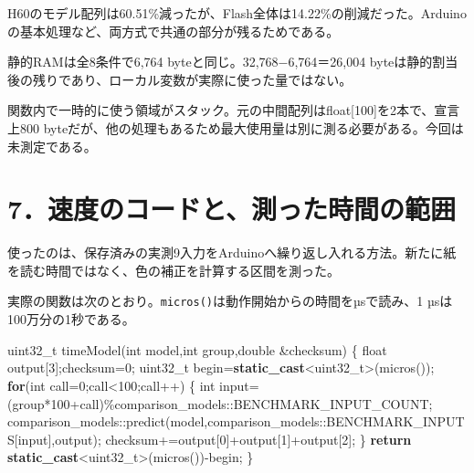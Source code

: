 \documentclass[
  11pt,
  a4paper,
]{article}
\newenvironment{Shaded}{}{}
\newcommand{\ControlFlowTok}[1]{\textcolor[rgb]{0.00,0.44,0.13}{\textbf{#1}}}
\newcommand{\DataTypeTok}[1]{\textcolor[rgb]{0.56,0.13,0.00}{#1}}
\newcommand{\DecValTok}[1]{\textcolor[rgb]{0.25,0.63,0.44}{#1}}
\newcommand{\KeywordTok}[1]{\textcolor[rgb]{0.00,0.44,0.13}{\textbf{#1}}}
\newcommand{\NormalTok}[1]{#1}
\newcommand{\OperatorTok}[1]{\textcolor[rgb]{0.40,0.40,0.40}{#1}}
\begin{document}
H60のモデル配列は60.51\%減ったが、Flash全体は14.22\%の削減だった。Arduinoの基本処理など、両方式で共通の部分が残るためである。

静的RAMは全8条件で6,764 byteと同じ。32,768−6,764＝26,004
byteは静的割当後の残りであり、ローカル変数が実際に使った量ではない。

関数内で一時的に使う領域がスタック。元の中間配列はfloat{[}100{]}を2本で、宣言上800
byteだが、他の処理もあるため最大使用量は別に測る必要がある。今回は未測定である。

\newpage

\section{7．速度のコードと、測った時間の範囲}\label{ux901fux5ea6ux306eux30b3ux30fcux30c9ux3068ux6e2cux3063ux305fux6642ux9593ux306eux7bc4ux56f2}

使ったのは、保存済みの実測9入力をArduinoへ繰り返し入れる方法。新たに紙を読む時間ではなく、色の補正を計算する区間を測った。

実際の関数は次のとおり。\texttt{micros()}は動作開始からの時間をµsで読み、1
µsは100万分の1秒である。

\begin{Shaded}
\begin{Highlighting}[]
\DataTypeTok{uint32\_t}\NormalTok{ timeModel}\OperatorTok{(}\DataTypeTok{int}\NormalTok{ model}\OperatorTok{,}\DataTypeTok{int}\NormalTok{ group}\OperatorTok{,}\DataTypeTok{double} \OperatorTok{\&}\NormalTok{checksum}\OperatorTok{)} \OperatorTok{\{}
  \DataTypeTok{float}\NormalTok{ output}\OperatorTok{[}\DecValTok{3}\OperatorTok{];}\NormalTok{checksum}\OperatorTok{=}\DecValTok{0}\OperatorTok{;}
  \DataTypeTok{uint32\_t}\NormalTok{ begin}\OperatorTok{=}\KeywordTok{static\_cast}\OperatorTok{\textless{}}\DataTypeTok{uint32\_t}\OperatorTok{\textgreater{}(}\NormalTok{micros}\OperatorTok{());}
  \ControlFlowTok{for}\OperatorTok{(}\DataTypeTok{int}\NormalTok{ call}\OperatorTok{=}\DecValTok{0}\OperatorTok{;}\NormalTok{call}\OperatorTok{\textless{}}\DecValTok{100}\OperatorTok{;}\NormalTok{call}\OperatorTok{++)} \OperatorTok{\{}
    \DataTypeTok{int}\NormalTok{ input}\OperatorTok{=(}\NormalTok{group}\OperatorTok{*}\DecValTok{100}\OperatorTok{+}\NormalTok{call}\OperatorTok{)\%}\NormalTok{comparison\_models}\OperatorTok{::}\NormalTok{BENCHMARK\_INPUT\_COUNT}\OperatorTok{;}
\NormalTok{    comparison\_models}\OperatorTok{::}\NormalTok{predict}\OperatorTok{(}\NormalTok{model}\OperatorTok{,}\NormalTok{comparison\_models}\OperatorTok{::}\NormalTok{BENCHMARK\_INPUTS}\OperatorTok{[}\NormalTok{input}\OperatorTok{],}\NormalTok{output}\OperatorTok{);}
\NormalTok{    checksum}\OperatorTok{+=}\NormalTok{output}\OperatorTok{[}\DecValTok{0}\OperatorTok{]+}\NormalTok{output}\OperatorTok{[}\DecValTok{1}\OperatorTok{]+}\NormalTok{output}\OperatorTok{[}\DecValTok{2}\OperatorTok{];}
  \OperatorTok{\}}
  \ControlFlowTok{return} \KeywordTok{static\_cast}\OperatorTok{\textless{}}\DataTypeTok{uint32\_t}\OperatorTok{\textgreater{}(}\NormalTok{micros}\OperatorTok{()){-}}\NormalTok{begin}\OperatorTok{;}
\OperatorTok{\}}
\end{Highlighting}
\end{Shaded}
\end{document}
